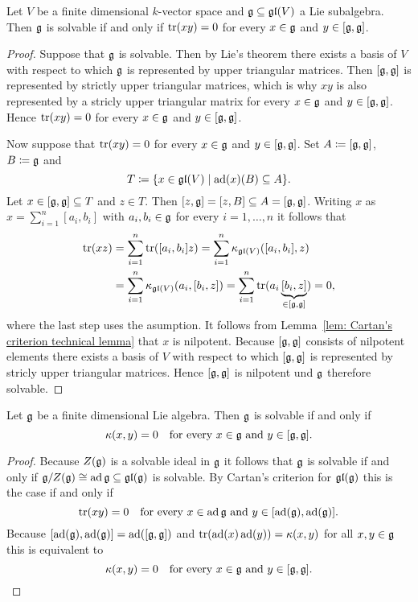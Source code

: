 \begin{lem} \label{lem: Cartans criterion for linear Lie algebra}
 Let $V$ be a finite dimensional $k$-vector space and $\mathfrak{g} \subseteq \mathfrak{gl}(V)$ a Lie subalgebra. Then $\mathfrak{g}$ is solvable if and only if $\operatorname{tr}(xy) = 0$ for every $x \in \mathfrak{g}$ and $y \in [\mathfrak{g},\mathfrak{g}]$.
\end{lem}
\begin{proof}
 Suppose that $\mathfrak{g}$ is solvable. Then by Lie’s theorem there exists a basis of $V$ with respect to which $\mathfrak{g}$ is represented by upper triangular matrices. Then $[\mathfrak{g},\mathfrak{g}]$ is represented by strictly upper triangular matrices, which is why $xy$ is also represented by a stricly upper triangular matrix for every $x \in \mathfrak{g}$ and $y \in [\mathfrak{g},\mathfrak{g}]$. Hence $\operatorname{tr}(xy) = 0$ for every $x \in \mathfrak{g}$ and $y \in [\mathfrak{g},\mathfrak{g}]$.
 
 Now suppose that $\operatorname{tr}(xy) = 0$ for every $x \in \mathfrak{g}$ and $y \in [\mathfrak{g},\mathfrak{g}]$. Set $A \coloneqq [\mathfrak{g},\mathfrak{g}]$, $B \coloneqq \mathfrak{g}$ and
 \[
  T \coloneqq \{x \in \mathfrak{gl}(V) \mid \operatorname{ad}(x)(B) \subseteq A\}.
 \]
 Let $x \in [\mathfrak{g},\mathfrak{g}] \subseteq T$ and $z \in T$. Then $[z,\mathfrak{g}] = [z,B] \subseteq A = [\mathfrak{g},\mathfrak{g}]$. Writing $x$ as $x = \sum_{i=1}^n [a_i, b_i]$ with $a_i, b_i \in \mathfrak{g}$ for every $i = 1, \dotsc, n$ it follows that
 \begin{align*}
  \operatorname{tr}(xz)
  &= \sum_{i=1}^n \operatorname{tr}([a_i, b_i] z)
  = \sum_{i=1}^n \kappa_{\mathfrak{gl}(V)}([a_i, b_i], z) \\
  &= \sum_{i=1}^n \kappa_{\mathfrak{gl}(V)}(a_i, [b_i, z])
  = \sum_{i=1}^n \operatorname{tr}(a_i \underbrace{[b_i, z]}_{\in [\mathfrak{g},\mathfrak{g}]})
  = 0,
 \end{align*}
 where the last step uses the asumption. It follows from Lemma~\ref{lem: Cartan's criterion technical lemma} that $x$ is nilpotent. Because $[\mathfrak{g},\mathfrak{g}]$ consists of nilpotent elements there exists a basis of $V$ with respect to which $[\mathfrak{g},\mathfrak{g}]$ is represented by stricly upper triangular matrices. Hence $[\mathfrak{g},\mathfrak{g}]$ is nilpotent und $\mathfrak{g}$ therefore solvable.
\end{proof}


\begin{thrm}
 Let $\mathfrak{g}$ be a finite dimensional Lie algebra. Then $\mathfrak{g}$ is solvable if and only if
 \[
  \kappa(x,y) = 0 \quad \text{for every $x \in \mathfrak{g}$ and $y \in [\mathfrak{g},\mathfrak{g}]$}.
 \]
\end{thrm}
\begin{proof}
 Because $Z(\mathfrak{g})$ is a solvable ideal in $\mathfrak{g}$ it follows that $\mathfrak{g}$ is solvable if and only if $\mathfrak{g}/Z(\mathfrak{g}) \cong \operatorname{ad} \mathfrak{g} \subseteq \mathfrak{gl}(\mathfrak{g})$ is solvable. By Cartan’s criterion for $\mathfrak{gl}(\mathfrak{g})$ this is the case if and only if
 \[
  \operatorname{tr}(xy) = 0 \quad \text{for every $x \in \operatorname{ad} \mathfrak{g}$ and $y \in [\operatorname{ad}(\mathfrak{g}), \operatorname{ad}(\mathfrak{g})]$}.
 \]
 Because $[\operatorname{ad}(\mathfrak{g}), \operatorname{ad}(\mathfrak{g})] = \operatorname{ad}([\mathfrak{g},\mathfrak{g}])$ and $\operatorname{tr}(\operatorname{ad}(x)\operatorname{ad}(y)) = \kappa(x,y)$ for all $x,y \in \mathfrak{g}$ this is equivalent to
 \[
  \kappa(x,y) = 0 \quad \text{for every $x \in \mathfrak{g}$ and $y \in [\mathfrak{g},\mathfrak{g}]$}.
  \qedhere
 \]
\end{proof}


